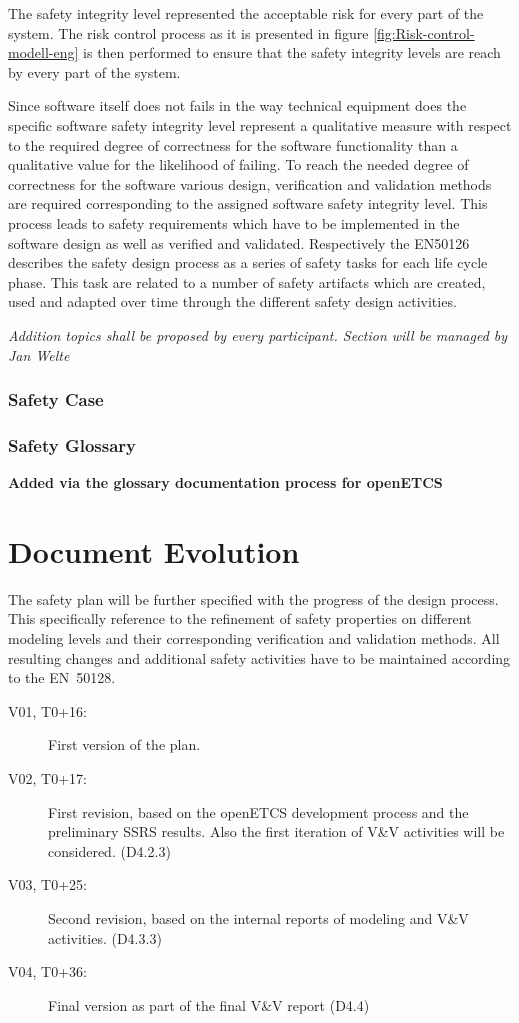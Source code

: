 \documentclass{template/openetcs_report}
\begin{document}
The safety integrity level represented the acceptable risk for every part of the system. The risk control process as it is presented in figure \ref{fig:Risk-control-modell-eng} is then performed to ensure that the safety integrity levels are reach by every part of the system.

Since software itself does not fails in the way technical equipment does the specific software safety integrity level represent a qualitative measure with respect to the required degree of correctness for the software functionality than a qualitative value for the likelihood of failing. To reach the needed degree of correctness for the software various design, verification and validation methods are required corresponding to the assigned software safety integrity level. This process leads to safety requirements which have to be implemented in the software design as well as verified and validated. Respectively the EN50126 describes the safety design process as a series of safety tasks for each life cycle phase. This task are related to a number of safety artifacts which are created, used and adapted over time through the different safety design activities.

\textit{Addition topics shall be proposed by every participant.
Section will be managed by Jan Welte}


\subsection{Safety Case}



\subsection{Safety Glossary}

\textbf{Added via the glossary documentation process for openETCS}

\chapter{Document Evolution}

The safety plan will be further specified with the progress of the design process. This specifically reference to the refinement of safety properties on different modeling levels and their corresponding verification and validation methods. All resulting changes and additional safety activities have to be maintained according to the EN~50128.

\begin{description}
\item[V01, T0+16:] First version of the plan. 
\item[V02, T0+17:] First revision, based on the openETCS development process and the preliminary SSRS results. Also the first iteration of V\&V activities will be considered. (D4.2.3)
\item[V03, T0+25:] Second revision, based on the internal reports of modeling and V\&V activities. (D4.3.3)
\item[V04, T0+36:] Final version as part of the final V\&V report (D4.4) 
\end{description}
\end{document}
